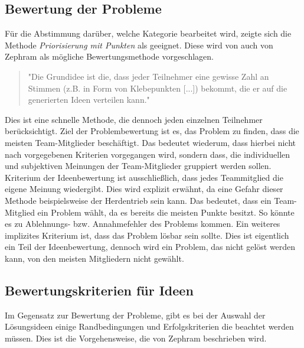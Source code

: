 \subsection{Bewertung der Probleme}\label{sec:retro-punkte}
Für die Abstimmung darüber, welche Kategorie bearbeitet wird, zeigte sich die Methode \textit{Priorisierung mit Punkten} 
als geeignet. Diese wird von auch von Zephram als mögliche Bewertungsmethode vorgeschlagen.
\begin{quote}
    "Die Grundidee ist die, dass jeder Teilnehmer eine gewisse Zahl an Stimmen (z.B. in Form von Klebepunkten [...]) bekommt, die er auf die generierten Ideen verteilen kann." \cite{dotmocracy:2011}
\end{quote} 
Dies ist eine schnelle Methode, die dennoch jeden einzelnen Teilnehmer berücksichtigt. Ziel der Problembewertung ist es, das Problem zu 
finden, dass die meisten Team-Mitglieder beschäftigt. Das bedeutet wiederum, dass hierbei nicht nach vorgegebenen Kriterien 
vorgegangen wird, sondern dass, die individuellen und subjektiven Meinungen der Team-Mitglieder gruppiert werden sollen. 
Kriterium der Ideenbewertung ist ausschließlich, dass jedes Teammitglied die eigene Meinung wiedergibt. Dies wird explizit erwähnt, 
da eine Gefahr dieser Methode beispielsweise der Herdentrieb sein kann. Das bedeutet, dass ein Team-Mitglied 
ein Problem wählt, da es bereits die meisten Punkte besitzt. So könnte es zu Ablehnungs- bzw. Annahmefehler des Problems kommen. \cite{derby:2012}
Ein weiteres implizites Kriterium ist, dass das Problem lösbar sein sollte. Dies ist eigentlich ein Teil der Ideenbewertung, 
dennoch wird ein Problem, das nicht gelöst werden kann, von den meisten Mitgliedern nicht gewählt. 

\subsection{Bewertungskriterien für Ideen}\label{sec:retro-kriterien}
Im Gegensatz zur Bewertung der Probleme, gibt es bei der Auswahl der Lösungsideen einige Randbedingungen
und Erfolgskriterien die beachtet werden müssen. Dies ist die Vorgehensweise, die von Zephram beschrieben wird.

